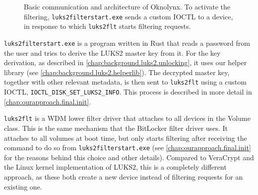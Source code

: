 \begin{figure}
	\center
	\small
	\caption[
		Basic communication and architecture of Oknolynx
	]{
		Basic communication and architecture of Oknolynx. To activate the filtering, \texttt{luks2filterstart.exe} sends a custom IOCTL to a device, in response to which \texttt{luks2flt} starts filtering requests.
	}
	\label{fig:ourapproach.final.communication}
\end{figure}

\texttt{luks2filterstart.exe} is a program written in Rust that reads a password from the user and tries to derive the LUKS2 master key from it. For the key derivation, as described in \autoref{chap:background.luks2.unlocking}, it uses our helper library (see \autoref{chap:background.luks2.helperlib}). The decrypted master key, together with other relevant metadata, is then sent to \texttt{luks2flt} using a custom IOCTL, \texttt{IOCTL\_DISK\_SET\_LUKS2\_INFO}. This process is described in more detail in \autoref{chap:ourapproach.final.init}.

\texttt{luks2flt} is a WDM lower filter driver that attaches to all devices in the Volume class. This is the same mechanism that the BitLocker filter driver uses. It attaches to all volumes at boot time, but only starts filtering after receiving the command to do so from \texttt{luks2filterstart.exe} (see \autoref{chap:ourapproach.final.init} for the reasons behind this choice and other details). Compared to VeraCrypt and the Linux kernel implementation of LUKS2, this is a completely different approach, as these both create a new device instead of filtering requests for an existing one.

